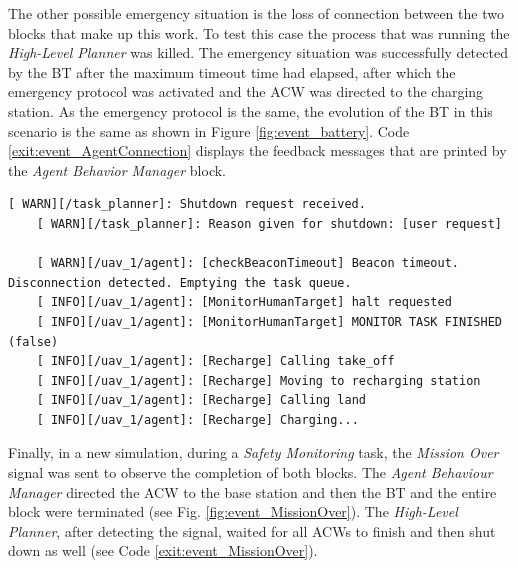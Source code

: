 The other possible emergency situation is the loss of connection between the two blocks that make up this work. To test this case the process that was running the \emph{High-Level Planner} was killed. The emergency situation was successfully detected by the \gls{BT} after the maximum timeout time had elapsed, after which the emergency protocol was activated and the \gls{ACW} was directed to the charging station. As the emergency protocol is the same, the evolution of the \gls{BT} in this scenario is the same as shown in Figure \ref{fig:event_battery}. Code \ref{exit:event_AgentConnection} displays the feedback messages that are printed by the \emph{Agent Behavior Manager} block.

\begin{lstlisting}[caption={Feedback messages printed by the \emph{Agent Behavior Manager} block after a connection loss}, breaklines=true, label=exit:event_AgentConnection]
    [ WARN][/task_planner]: Shutdown request received.
    [ WARN][/task_planner]: Reason given for shutdown: [user request]
    
    [ WARN][/uav_1/agent]: [checkBeaconTimeout] Beacon timeout. Disconnection detected. Emptying the task queue.
    [ INFO][/uav_1/agent]: [MonitorHumanTarget] halt requested
    [ INFO][/uav_1/agent]: [MonitorHumanTarget] MONITOR TASK FINISHED (false)
    [ INFO][/uav_1/agent]: [Recharge] Calling take_off
    [ INFO][/uav_1/agent]: [Recharge] Moving to recharging station
    [ INFO][/uav_1/agent]: [Recharge] Calling land
    [ INFO][/uav_1/agent]: [Recharge] Charging...
\end{lstlisting}

Finally, in a new simulation, during a \emph{Safety Monitoring} task, the \emph{Mission Over} signal was sent to observe the completion of both blocks. The \emph{Agent Behaviour Manager} directed the \gls{ACW} to the base station and then the \gls{BT} and the entire block were terminated (see Fig. \ref{fig:event_MissionOver}). The \emph{High-Level Planner}, after detecting the signal, waited for all \glspl{ACW} to finish and then shut down as well (see Code \ref{exit:event_MissionOver}).


